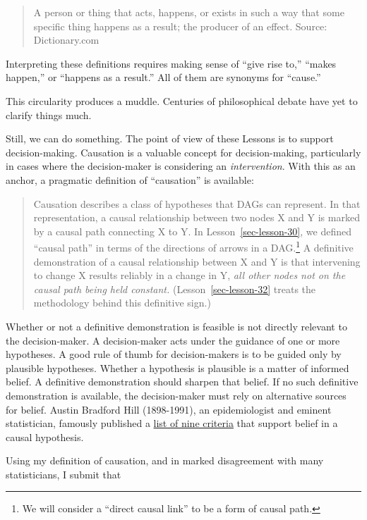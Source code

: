 \documentclass[
  letterpaper,
  DIV=11,
  numbers=noendperiod,
  oneside]{scrreprt}
\begin{document}
\begin{quote}
A person or thing that acts, happens, or exists in such a way that some
specific thing happens as a result; the producer of an effect. Source:
Dictionary.com
\end{quote}

Interpreting these definitions requires making sense of ``give rise
to,'' ``makes happen,'' or ``happens as a result.'' All of them are
synonyms for ``cause.''

This circularity produces a muddle. Centuries of philosophical debate
have yet to clarify things much.

Still, we can do something. The point of view of these Lessons is to
support decision-making. Causation is a valuable concept for
decision-making, particularly in cases where the decision-maker is
considering an \emph{intervention}. With this as an anchor, a pragmatic
definition of ``causation'' is available:

\begin{quote}
Causation describes a class of hypotheses that DAGs can represent. In
that representation, a causal relationship between two nodes X and Y is
marked by a causal path connecting X to Y. In
Lesson~\ref{sec-lesson-30}, we defined ``causal path'' in terms of the
directions of arrows in a DAG.\footnote{We will consider a ``direct
  causal link'' to be a form of causal path.} A definitive demonstration
of a causal relationship between X and Y is that intervening to change X
results reliably in a change in Y, \emph{all other nodes not on the
causal path being held constant.} (Lesson~\ref{sec-lesson-32} treats the
methodology behind this definitive sign.)
\end{quote}

Whether or not a definitive demonstration is feasible is not directly
relevant to the decision-maker. A decision-maker acts under the guidance
of one or more hypotheses. A good rule of thumb for decision-makers is
to be guided only by plausible hypotheses. Whether a hypothesis is
plausible is a matter of informed belief. A definitive demonstration
should sharpen that belief. If no such definitive demonstration is
available, the decision-maker must rely on alternative sources for
belief. Austin Bradford Hill (1898-1991), an epidemiologist and eminent
statistician, famously published a
\href{https://en.wikipedia.org/wiki/Bradford_Hill_criteria}{list of nine
criteria} that support belief in a causal hypothesis.

Using my definition of causation, and in marked disagreement with many
statisticians, I submit that
\end{document}
